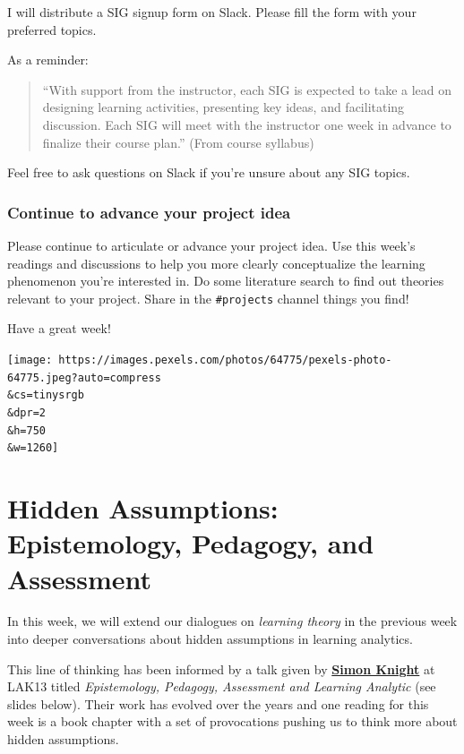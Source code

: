 \documentclass[
]{book}
\begin{document}
I will distribute a SIG signup form on Slack. Please fill the form with your preferred topics.

As a reminder:

\begin{quote}
``With support from the instructor, each SIG is expected to take a lead on designing learning activities, presenting key ideas, and facilitating discussion. Each SIG will meet with the instructor one week in advance to finalize their course plan.'' (From course syllabus)
\end{quote}

Feel free to ask questions on Slack if you're unsure about any SIG topics.

\hypertarget{continue-to-advance-your-project-idea}{%
\subsection{Continue to advance your project idea}\label{continue-to-advance-your-project-idea}}

Please continue to articulate or advance your project idea. Use this week's readings and discussions to help you more clearly conceptualize the learning phenomenon you're interested in. Do some literature search to find out theories relevant to your project. Share in the \texttt{\#projects} channel things you find!

Have a great week!

\texttt{[image: https://images.pexels.com/photos/64775/pexels-photo-64775.jpeg?auto=compress\\\&cs=tinysrgb\\\&dpr=2\\\&h=750\\\&w=1260]}

\hypertarget{hidden-assumptions-epistemology-pedagogy-and-assessment}{%
\chapter{Hidden Assumptions: Epistemology, Pedagogy, and Assessment}\label{hidden-assumptions-epistemology-pedagogy-and-assessment}}

In this week, we will extend our dialogues on \emph{learning theory} in the previous week into deeper conversations about hidden assumptions in learning analytics.

This line of thinking has been informed by a talk given by \textbf{\href{https://twitter.com/sjgknight?lang=en}{Simon Knight}} at LAK13 titled \emph{Epistemology, Pedagogy, Assessment and Learning Analytic} (see slides below). Their work has evolved over the years and one reading for this week is a book chapter with a set of provocations pushing us to think more about hidden assumptions.
\end{document}
